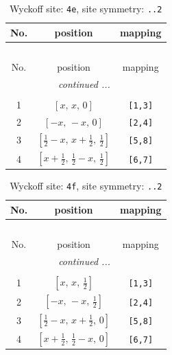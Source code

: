 \documentclass[fleqn,8pt]{jsarticle}
\begin{document}
\renewcommand{\arraystretch}{1.2}
\begin{longtable}{ccc}
\caption{Wyckoff site: {\tt 4e}, site symmetry: {\tt ..2}}
 \\
 \hline \hline
No. & position & mapping \\ \hline \endfirsthead

\multicolumn{2}{l}{\tablename\ \thetable{}} \\
 \hline \hline
No. & position & mapping \\ \hline \endhead

 \hline \hline
\multicolumn{2}{r}{\footnotesize\it continued ...} \\ \endfoot

 \hline \hline
\multicolumn{2}{r}{} \\ \endlastfoot

1 & $\left[ x,\, x,\, 0 \right]$ & {\tt [1,3]} \\ \hline
2 & $\left[ - x,\, - x,\, 0 \right]$ & {\tt [2,4]} \\ \hline
3 & $\left[ \frac{1}{2} - x,\, x + \frac{1}{2},\, \frac{1}{2} \right]$ & {\tt [5,8]} \\ \hline
4 & $\left[ x + \frac{1}{2},\, \frac{1}{2} - x,\, \frac{1}{2} \right]$ & {\tt [6,7]} \\
\end{longtable}
\renewcommand{\arraystretch}{1.2}
\begin{longtable}{ccc}
\caption{Wyckoff site: {\tt 4f}, site symmetry: {\tt ..2}}
 \\
 \hline \hline
No. & position & mapping \\ \hline \endfirsthead

\multicolumn{2}{l}{\tablename\ \thetable{}} \\
 \hline \hline
No. & position & mapping \\ \hline \endhead

 \hline \hline
\multicolumn{2}{r}{\footnotesize\it continued ...} \\ \endfoot

 \hline \hline
\multicolumn{2}{r}{} \\ \endlastfoot

1 & $\left[ x,\, x,\, \frac{1}{2} \right]$ & {\tt [1,3]} \\ \hline
2 & $\left[ - x,\, - x,\, \frac{1}{2} \right]$ & {\tt [2,4]} \\ \hline
3 & $\left[ \frac{1}{2} - x,\, x + \frac{1}{2},\, 0 \right]$ & {\tt [5,8]} \\ \hline
4 & $\left[ x + \frac{1}{2},\, \frac{1}{2} - x,\, 0 \right]$ & {\tt [6,7]} \\
\end{longtable}
\end{document}
